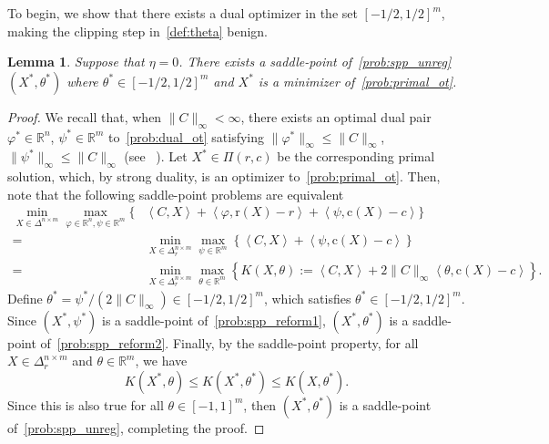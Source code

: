 \documentclass[10pt]{article}
\newcommand{\R}{\mathbb{R}}
\newcommand{\inner}[2]{\left\langle #1,#2\right\rangle}
\newcommand{\coup}{\Pi}
\theoremstyle{plain}
\newtheorem{lemma}[theorem]{Lemma}
\theoremstyle{definition}
\theoremstyle{remark}
\newcommand{\col}{\bm{\mathrm{c}}}
\newcommand{\row}{\bm{\mathrm{r}}}
\begin{document}
To begin, we show that there exists a dual optimizer in the set $[-1/2,1/2]^m$, making the clipping step in~\eqref{def:theta} benign.

\begin{lemma}\label{lem:b_choice}
    Suppose that $\eta=0$. There exists a saddle-point of~\eqref{prob:spp_unreg} $(X^*,\theta^*)$ where $\theta^*\in[-1/2, 1/2]^m$ and $X^*$ is a minimizer of~\eqref{prob:primal_ot}.
\end{lemma}
\begin{proof}
    We recall that, when $\|C\|_\infty<\infty$, there exists an optimal dual pair $\varphi^*\in\R^n$, $\psi^*\in\R^m$ to~\eqref{prob:dual_ot} satisfying $\|\varphi^*\|_\infty\leq \|C\|_\infty$, $\|\psi^*\|_\infty\leq \|C\|_\infty$ (see ~\cite[Remark 1.13]{villaniTopicsOptimalTransportation2003}). Let $X^*\in \coup(r,c)$ be the corresponding primal solution, which, by strong duality, is an optimizer to~\eqref{prob:primal_ot}. Then, note that the following saddle-point problems are equivalent
    \begin{align}
        \nonumber\min_{X\in\Delta^{n\times m}}\max_{\varphi\in\R^n,\psi\in\R^m}\{&\inner{C}{X}+\inner{\varphi}{\row(X)-r}+\inner{\psi}{\col(X)-c}\}\\
        =&\min_{X\in\Delta_r^{n\times m}}\max_{\psi\in\R^m}\left\{\inner{C}{X}+\inner{\psi}{\col(X)-c}\right\}\label{prob:spp_reform1}\\
        =&\min_{X\in\Delta_r^{n\times m}}\max_{\theta\in\R^m}\left\{K(X,\theta):=\inner{C}{X}+2\|C\|_\infty\inner{\theta}{\col(X)-c}\right\}\label{prob:spp_reform2}.
    \end{align}
      Define $\theta^*=\psi^*/(2\|C\|_\infty)\in[-1/2,1/2]^m$, which satisfies $\theta^*\in[-1/2,1/2]^m$.  
    Since $(X^*,\psi^*)$ is a saddle-point of~\eqref{prob:spp_reform1}, $(X^*,\theta^*)$ is a saddle-point of~\eqref{prob:spp_reform2}. Finally, by the saddle-point property, for all $X\in\Delta_r^{n\times m}$ and $\theta\in\R^m$, we have
    \[
        K(X^*,\theta)\leq K(X^*,\theta^*)\leq K(X,\theta^*).
    \]
    Since this is also true for all $\theta\in[-1,1]^m$, then $(X^*,\theta^*)$ is a saddle-point of~\eqref{prob:spp_unreg}, completing the proof.
\end{proof}
\end{document}
